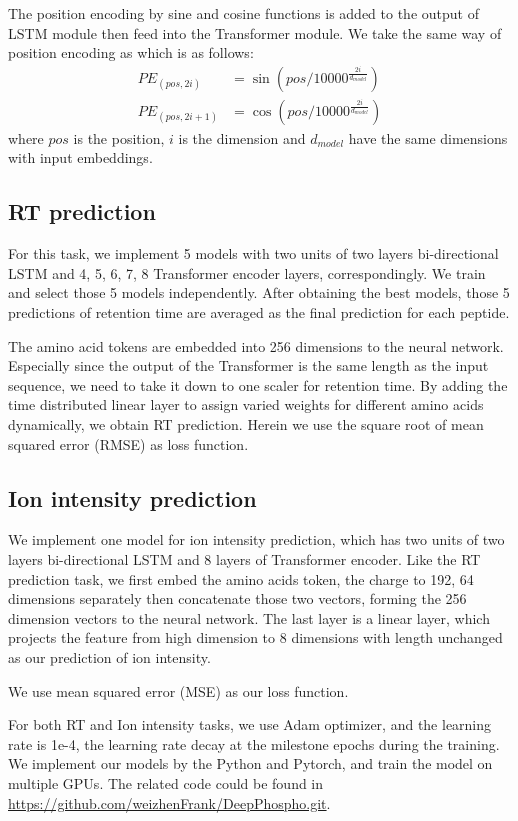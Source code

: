 The position encoding by sine and cosine functions is added to the output of LSTM module then feed into the Transformer module.
We take the same way of position encoding as \cite{vaswani2017attention} which is as follows:
\begin{align*}
    PE_{(pos, 2i)} &= \sin{(pos/10000^{\frac{2i}{d_{model}}})} \\
    PE_{(pos, 2i+1)} &= \cos{(pos/10000^{\frac{2i}{d_{model}}})}
\end{align*}
where $pos$  is the position, $i$ is the dimension and $d_{model}$ have the same dimensions with input embeddings.

\subsection{RT prediction}

For this task, we implement
5 models with two units of two layers bi-directional LSTM and 4, 5, 6, 7, 8 Transformer encoder layers, correspondingly. We train and select those 5 models independently. After obtaining the best models, those 5 predictions of retention time are averaged as the final prediction for each peptide.

The amino acid tokens are embedded into 256 dimensions to the neural network.
Especially since the output of the Transformer is the same length as the input sequence, we need to take it down to one scaler for retention time. By adding the time distributed linear layer to assign varied weights for different amino acids dynamically, we obtain RT prediction.
Herein we use the square root of mean squared error (RMSE) as loss function.

\subsection{Ion intensity prediction}

We implement one model for ion intensity prediction, which has two units of two layers bi-directional LSTM and 8 layers of Transformer encoder. Like the RT prediction task, we first embed the amino acids token, the charge to 192, 64 dimensions separately then concatenate those two vectors, forming the 256 dimension vectors to the neural network. The last layer is a linear layer, which projects the feature from high dimension to 8 dimensions with length unchanged as our prediction of ion intensity.

We use mean squared
error (MSE) as our loss function.

For both RT and Ion intensity tasks, we use Adam optimizer\cite{kingma2017adam}, and the learning rate is 1e-4, the learning rate decay at the milestone epochs during the training. We implement our models by the Python and Pytorch, and train the model on multiple GPUs. The related code could be found in \url{https://github.com/weizhenFrank/DeepPhospho.git}.


